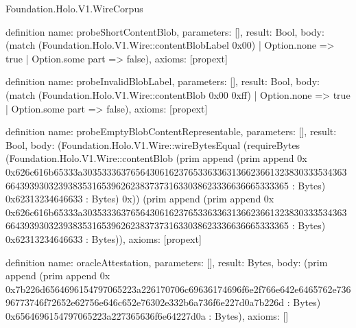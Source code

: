 \begin{lexlean}{Foundation.Holo.V1.WireCorpus}
\begin{semanticmodule}
definition{
  name: probeShortContentBlob,
  parameters: [],
  result: Bool,
  body: (match (Foundation.Holo.V1.Wire::contentBlobLabel 0x00)
    | Option.none => true
    | Option.some part => false),
  axioms: [propext]
}

definition{
  name: probeInvalidBlobLabel,
  parameters: [],
  result: Bool,
  body: (match (Foundation.Holo.V1.Wire::contentBlob 0x00 0xff)
    | Option.none => true
    | Option.some part => false),
  axioms: [propext]
}

definition{
  name: probeEmptyBlobContentRepresentable,
  parameters: [],
  result: Bool,
  body: (Foundation.Holo.V1.Wire::wireBytesEqual (requireBytes (Foundation.Holo.V1.Wire::contentBlob (prim append (prim append 0x 0x626c616b65333a303533363765643061623765336336313662366132383033353436366439393032393835316539626238373731633038623336636665333365 : Bytes) 0x62313234646633 : Bytes) 0x)) (prim append (prim append 0x 0x626c616b65333a303533363765643061623765336336313662366132383033353436366439393032393835316539626238373731633038623336636665333365 : Bytes) 0x62313234646633 : Bytes)),
  axioms: [propext]
}

definition{
  name: oracleAttestation,
  parameters: [],
  result: Bytes,
  body: (prim append (prim append 0x 0x7b226d6564696154797065223a226170706c69636174696f6e2f766e642e6465762e73696773746f72652e62756e646c652e76302e332b6a736f6e227d0a7b226d : Bytes) 0x6564696154797065223a227365636f6e64227d0a : Bytes),
  axioms: []
}


\end{semanticmodule}
\end{lexlean}
